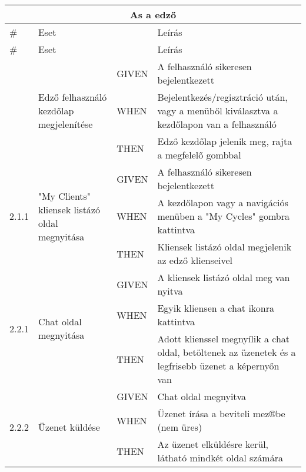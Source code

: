 \begin{center}
	\begin{longtable}{ | p{} | p{} | p{} | p{} | }
			
			\hline
			\multicolumn{4}{|c|}{\textbf{As a edző}}
			\\ \hline
			
			\# & Eset & & Leírás
			\\ \hline \hline
			\endfirsthead %
			
			\hline
			\# & Eset & & Leírás
			\\ \hline \hline
			\endhead %
			
			\hline
			\endfoot %
			
			\endlastfoot %
			

			\multirow{3}{*}{2.0.1} 
			& \multirow{3}{=}{Edző felhasználó kezdőlap megjelenítése} 
			& GIVEN 
			& A felhasználó sikeresen bejelentkezett \\
			\cline{3-4}
			& & WHEN 
			& Bejelentkezés/regisztráció után, vagy a menüből kiválasztva a kezdőlapon van a felhasználó \\
			\cline{3-4}
			& & THEN 
			& Edző kezdőlap jelenik meg, rajta a megfelelő gombbal \\
			\hline

			\multirow{3}{*}{2.1.1} 
			& \multirow{3}{=}{"My Clients" kliensek listázó oldal megnyitása} 
			& GIVEN 
			& A felhasználó sikeresen bejelentkezett \\
			\cline{3-4}
			& & WHEN 
			& A kezdőlapon vagy a navigációs menüben a
			"My Cycles" gombra kattintva \\
			\cline{3-4}
			& & THEN 
			& Kliensek listázó oldal megjelenik az edző klienseivel \\
			\hline

			\multirow{3}{*}{2.2.1} 
			& \multirow{3}{=}{Chat oldal megnyitása} 
			& GIVEN 
			& A kliensek listázó oldal meg van nyitva \\
			\cline{3-4}
			& & WHEN 
			& Egyik kliensen a chat ikonra kattintva \\
			\cline{3-4}
			& & THEN 
			& Adott klienssel megnyílik a chat oldal, betöltenek az üzenetek és a legfrisebb üzenet a képernyőn van \\
			\hline

			\multirow{3}{*}{2.2.2} 
			& \multirow{3}{=}{Üzenet küldése} 
			& GIVEN 
			& Chat oldal megnyitva \\
			\cline{3-4}
			& & WHEN 
			& Üzenet írása a beviteli mez®be (nem üres) \\
			\cline{3-4}
			& & THEN 
			& Az üzenet elküldésre kerül, látható mindkét
			oldal számára \\
			\hline





\end{longtable}
\end{center}
